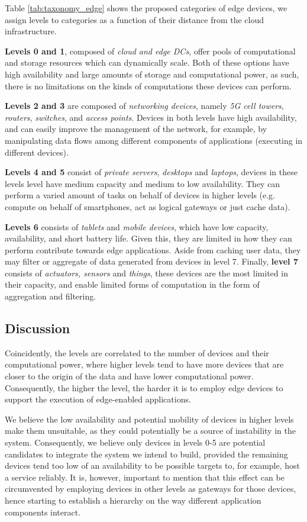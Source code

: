 Table \ref{tab:taxonomy_edge} shows the proposed categories of edge devices, we assign levels to categories as a function of their distance from the cloud infrastructure. 

\textbf{Levels 0 and 1}, composed of \textit{cloud and edge DCs}, offer pools of computational and storage resources which can dynamically scale. Both of these options have high availability and large amounts of storage and computational power, as such, there is no limitations on the kinds of computations these devices can perform.

\textbf{Levels 2 and 3} are composed of \textit{networking devices}, namely 
\textit{5G cell towers}, \textit{routers}, \textit{switches}, and \textit{access points}. Devices in both levels have high availability, and can easily improve the management of the network, for example, by manipulating data flows among different components of applications (executing in different devices).

\textbf{Levels 4 and  5} consist of \textit{private servers}, \textit{desktops} and \textit{laptops}, devices in these levels level have medium capacity and medium to low availability. They can perform a varied amount of tasks on behalf of devices in higher levels (e.g. compute on behalf of smartphones, act as logical gateways or just cache data). 

\textbf{Levels 6} consists of \textit{tablets} and \textit{mobile devices}, which have low capacity, availability, and short battery life. Given this, they are limited in how they can perform contribute towards edge applications. Aside from caching user data, they may filter or aggregate of data generated from devices in level 7. Finally, \textbf{level 7} consists of \textit{actuators, sensors} and \textit{things}, these devices are the most limited in their capacity, and enable limited forms of computation in the form of aggregation and filtering.

\subsection{Discussion}

Coincidently, the levels are correlated to the number of devices and their computational power, where higher levels tend to have more devices that are closer to the origin of the data and have lower computational power. Consequently, the higher the level, the harder it is to employ edge devices to support the execution of edge-enabled applications. 

We believe the low availability and potential mobility of devices in higher levels make them unsuitable, as they could potentially be a source of instability in the system. Consequently,  we believe only devices in levels 0-5 are potential candidates to integrate the system we intend to build, provided the remaining devices tend too low of an availability to be possible targets to, for example, host a service reliably. It is, however, important to mention that this effect can be circumvented by employing devices in other levels as gateways for those devices, hence starting to establish a hierarchy on the way different application components interact. 
